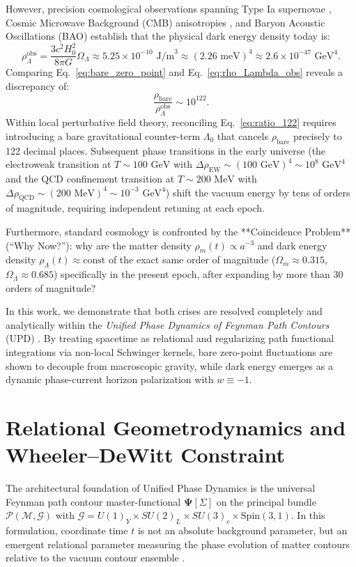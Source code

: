\documentclass[11pt,a4paper]{article}
\begin{document}
However, precision cosmological observations spanning Type Ia supernovae \cite{Riess1998, Perlmutter1999, Brout2022}, Cosmic Microwave Background (CMB) anisotropies \cite{Planck2020}, and Baryon Acoustic Oscillations (BAO) \cite{DESI2024} establish that the physical dark energy density today is:
\begin{equation}
\rho_\Lambda^{\mathrm{obs}} = \frac{3 c^2 H_0^2}{8\pi G} \Omega_\Lambda \approx 5.25 \times 10^{-10}\text{ J/m}^3 \approx (2.26\text{ meV})^4 \approx 2.6 \times 10^{-47}\text{ GeV}^4.
\label{eq:rho_Lambda_obs}
\end{equation}
Comparing Eq.~\eqref{eq:bare_zero_point} and Eq.~\eqref{eq:rho_Lambda_obs} reveals a discrepancy of:
\begin{equation}
\frac{\rho_{\mathrm{bare}}}{\rho_\Lambda^{\mathrm{obs}}} \sim 10^{122}.
\label{eq:ratio_122}
\end{equation}
Within local perturbative field theory, reconciling Eq.~\eqref{eq:ratio_122} requires introducing a bare gravitational counter-term $\Lambda_0$ that cancels $\rho_{\mathrm{bare}}$ precisely to 122 decimal places. Subsequent phase transitions in the early universe (the electroweak transition at $T \sim 100\text{ GeV}$ with $\Delta \rho_{\mathrm{EW}} \sim (100\text{ GeV})^4 \sim 10^8\text{ GeV}^4$ and the QCD confinement transition at $T \sim 200\text{ MeV}$ with $\Delta \rho_{\mathrm{QCD}} \sim (200\text{ MeV})^4 \sim 10^{-3}\text{ GeV}^4$) shift the vacuum energy by tens of orders of magnitude, requiring independent retuning at each epoch.

Furthermore, standard cosmology is confronted by the **Coincidence Problem** (``Why Now?''): why are the matter density $\rho_m(t) \propto a^{-3}$ and dark energy density $\rho_\Lambda(t) \approx \mathrm{const}$ of the exact same order of magnitude ($\Omega_m \approx 0.315$, $\Omega_\Lambda \approx 0.685$) specifically in the present epoch, after expanding by more than 30 orders of magnitude?

In this work, we demonstrate that both crises are resolved completely and analytically within the \textit{Unified Phase Dynamics of Feynman Path Contours} (UPD) \cite{PavliukMonograph2026}. By treating spacetime as relational and regularizing path functional integrations via non-local Schwinger kernels, bare zero-point fluctuations are shown to decouple from macroscopic gravity, while dark energy emerges as a dynamic phase-current horizon polarization with $w \equiv -1$.

\section{Relational Geometrodynamics and Wheeler--DeWitt Constraint}
The architectural foundation of Unified Phase Dynamics is the universal Feynman path contour master-functional $\mathbf{\Psi}[\Sigma]$ on the principal bundle $\mathcal{P}(\mathcal{M}, \mathcal{G})$ with $\mathcal{G} = U(1)_Y \times SU(2)_L \times SU(3)_c \times \text{Spin}(3,1)$. In this formulation, coordinate time $t$ is not an absolute background parameter, but an emergent relational parameter measuring the phase evolution of matter contours relative to the vacuum contour ensemble \cite{PavliukMonograph2026, PavliukZenodo8}.
\end{document}
